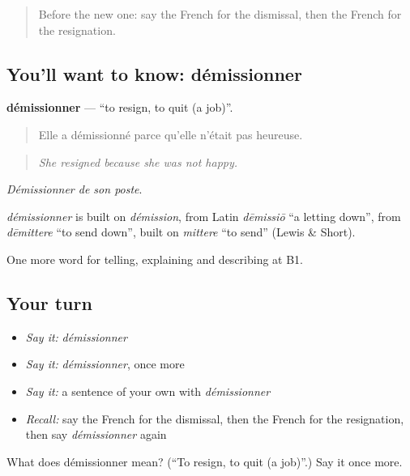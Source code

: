 \begin{quote}
Before the new one: say the French for the dismissal, then the French for the resignation.
\end{quote}

\subsection*{You'll want to know: démissionner}
\textbf{démissionner} — \textquotedblleft{}to resign, to quit (a job)\textquotedblright{}.

\begin{quote}
Elle a démissionné parce qu'elle n'était pas heureuse.
\end{quote}

\begin{quote}
\emph{She resigned because she was not happy.}
\end{quote}

\emph{Démissionner de son poste}.

\begin{cousinweb}
\emph{démissionner} is built on \emph{démission}, from Latin \emph{dēmissiō} \textquotedblleft{}a letting down\textquotedblright{}, from \emph{dēmittere} \textquotedblleft{}to send down\textquotedblright{}, built on \emph{mittere} \textquotedblleft{}to send\textquotedblright{} (Lewis \& Short).
\end{cousinweb}

\begin{grammarlens}[title={What you've built}]
One more word for telling, explaining and describing at B1.
\end{grammarlens}

\subsection*{Your turn}
\begin{itemize}
\raggedright
  \item \emph{Say it:} \emph{démissionner}
  \item \emph{Say it:} \emph{démissionner}, once more
  \item \emph{Say it:} a sentence of your own with \emph{démissionner}
  \item \emph{Recall:} say the French for the dismissal, then the French for the resignation, then say \emph{démissionner} again
\end{itemize}

\begin{tcolorbox}[breakable,colback=teal!4,colframe=teal!35!black,title={Before you move on}]
What does démissionner mean? (\textquotedblleft{}To resign, to quit (a job)\textquotedblright{}.) Say it once more.
\end{tcolorbox}
